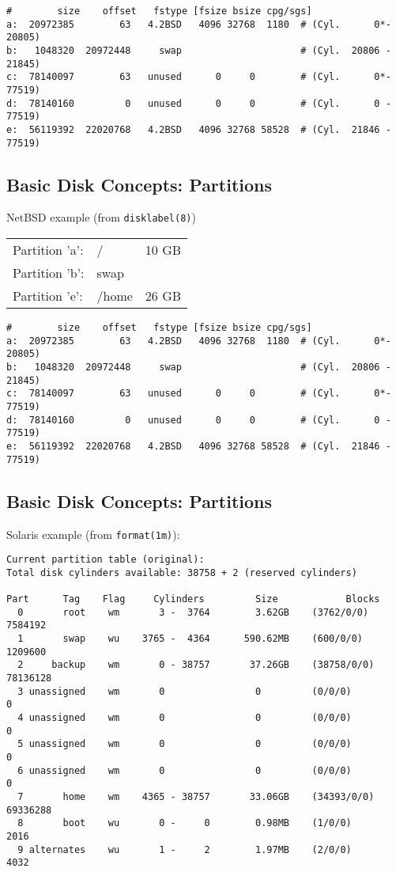 \documentclass[xga]{xdvislides}
\begin{document}
\begin{verbatim}
#        size    offset   fstype [fsize bsize cpg/sgs]
a:  20972385        63   4.2BSD   4096 32768  1180  # (Cyl.      0*- 20805)
b:   1048320  20972448     swap                     # (Cyl.  20806 - 21845)
c:  78140097        63   unused      0     0        # (Cyl.      0*- 77519)
d:  78140160         0   unused      0     0        # (Cyl.      0 - 77519)
e:  56119392  22020768   4.2BSD   4096 32768 58528  # (Cyl.  21846 - 77519)
\end{verbatim}

\subsection{Basic Disk Concepts: Partitions}
NetBSD example (from {\tt disklabel(8)})

\begin{tabular}{ l l c }
Partition 'a': & / & 10 GB\\
Partition 'b': & swap & \\
Partition 'e': & /home & 26 GB\\
\end{tabular}

\begin{verbatim}
#        size    offset   fstype [fsize bsize cpg/sgs]
a:  20972385        63   4.2BSD   4096 32768  1180  # (Cyl.      0*- 20805)
b:   1048320  20972448     swap                     # (Cyl.  20806 - 21845)
c:  78140097        63   unused      0     0        # (Cyl.      0*- 77519)
d:  78140160         0   unused      0     0        # (Cyl.      0 - 77519)
e:  56119392  22020768   4.2BSD   4096 32768 58528  # (Cyl.  21846 - 77519)
\end{verbatim}


\subsection{Basic Disk Concepts: Partitions}
Solaris example (from {\tt format(1m)}):
\begin{verbatim}
Current partition table (original):
Total disk cylinders available: 38758 + 2 (reserved cylinders)

Part      Tag    Flag     Cylinders         Size            Blocks
  0       root    wm       3 -  3764        3.62GB    (3762/0/0)   7584192
  1       swap    wu    3765 -  4364      590.62MB    (600/0/0)    1209600
  2     backup    wm       0 - 38757       37.26GB    (38758/0/0) 78136128
  3 unassigned    wm       0                0         (0/0/0)            0
  4 unassigned    wm       0                0         (0/0/0)            0
  5 unassigned    wm       0                0         (0/0/0)            0
  6 unassigned    wm       0                0         (0/0/0)            0
  7       home    wm    4365 - 38757       33.06GB    (34393/0/0) 69336288
  8       boot    wu       0 -     0        0.98MB    (1/0/0)         2016
  9 alternates    wu       1 -     2        1.97MB    (2/0/0)         4032
\end{verbatim}
\end{document}
